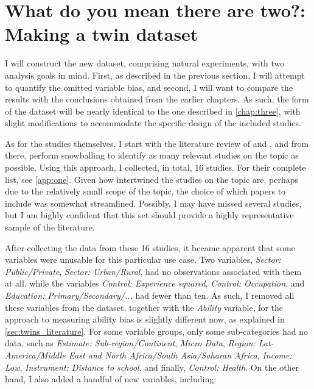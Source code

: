 \section{What do you mean there are two?: Making a twin dataset}
\label{sec:twins_data}

I will construct the new dataset, comprising natural experiments, with two analysis goals in mind. First, as described in the previous section, I will attempt to quantify the omitted variable bias, and second, I will want to compare the results with the conclusions obtained from the earlier chapters. As such, the form of the dataset will be nearly identical to the one described in \autoref{chap:three}, with slight modifications to accommodate the specific design of the included studies.

As for the studies themselves, I start with the literature review of \cite{nakamuro2012estimating} and \cite{li2012estimating}, and from there, perform snowballing to identify as many relevant studies on the topic as possible. Using this approach, I collected, in total, 16 studies. For their complete list, see \autoref{app:one}.  Given how intertwined the studies on the topic are, perhaps due to the relatively small scope of the topic, the choice of which papers to include was somewhat streamlined. Possibly, I may have missed several studies, but I am highly confident that this set should provide a highly representative sample of the literature.

After collecting the data from these 16 studies, it became apparent that some variables were unusable for this particular use case. Two variables, \textit{Sector: Public/Private}, \textit{Sector: Urban/Rural}, had no observations associated with them at all, while the variables \textit{Control: Experience squared}, \textit{Control: Occupation}, and \textit{Education: Primary/Secondary/...} had fewer than ten. As such, I removed all these variables from the dataset, together with the \textit{Ability} variable, for the approach to measuring ability bias is slightly different now, as explained in \autoref{sec:twins_literature}. For some variable groups, only some sub-categories had no data, such as \textit{Estimate: Sub-region/Continent}, \textit{Micro Data}, \textit{Region: Lat-America/Middle East and North Africa/South Asia/Saharan Africa}, \textit{Income: Low}, \textit{Instrument: Distance to school}, and finally, \textit{Control: Health}. On the other hand, I also added a handful of new variables, including:

